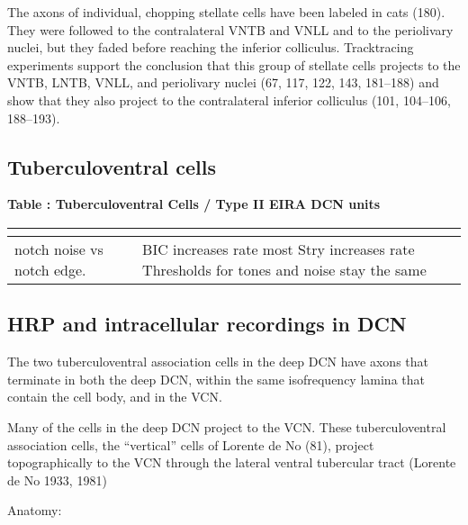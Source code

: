 \documentclass[10pt,a4paper]{article}
\begin{document}
The axons of individual, chopping stellate cells have been labeled in cats
(180). They were followed to the contralateral VNTB and VNLL and to the
periolivary nuclei, but they faded before reaching the inferior
colliculus. Tracktracing
experiments support the conclusion that this group of stellate cells
projects to the VNTB, LNTB, VNLL, and periolivary nuclei (67, 117, 122, 143,
181--188) and show that they also project to the contralateral inferior
colliculus (101, 104--106, 188--193).

\subsection{Tuberculoventral cells} 

{\bfseries Table : Tuberculoventral Cells / Type II EIRA DCN
  units}

\begin{flushleft}

  \begin{tabularx}{\textwidth}{XXX}
    \toprule
    \citep{EvansNelson:1973,WickesbergOertel:1990,WickesbergOertel:1993,WickesbergOertel:1988,WickesbergWhitlonEtAl:1991,Wickesberg:1996,YoungBrownell:1976,YoungVoigt:1981,ZhangOertel:1993}
    &
    \citep{RhodeGreenberg:1992,ShofnerYoung:1985,SpirouDavisEtAl:1999} &
    \citep{DavisYoung:2000}\\\hline
 \citep{ReissYoung:2005} notch noise vs notch    edge.  &
    &
     BIC increases rate most
    Stry increases rate
    Thresholds for tones and noise stay the same\\\hline
  \end{tabularx}
\end{flushleft}

\subsection{\citep{OertelWu:1989} HRP and intracellular recordings in DCN}

The two tuberculoventral association cells in the deep DCN have axons that
terminate in both the deep DCN, within the same isofrequency lamina that contain
the cell body, and in the VCN.

Many of the cells in the deep DCN project to the VCN.  These tuberculoventral
association cells, the ``vertical'' cells of
Lorente de No (81), project topographically to the VCN through the lateral
ventral tubercular tract (Lorente de No{\textasciigrave} 1933, 1981)

Anatomy:
\end{document}
